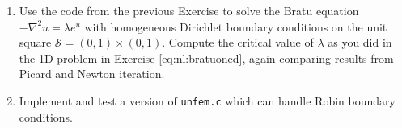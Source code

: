 \begin{enumerate}
\item \label{exer:un:bratu} Use the code from the previous Exercise to solve the Bratu equation $-\nabla^2 u = \lambda e^u$ with homogeneous Dirichlet boundary conditions on the unit square $\mathcal{S}=(0,1)\times(0,1)$.  Compute the critical value of $\lambda$ as you did in the 1D problem in Exercise \ref{eq:nl:bratuoned}, again comparing results from Picard and Newton iteration.
\item \label{exer:un:robin} Implement and test a version of \texttt{unfem.c} which can handle Robin boundary conditions.
\end{enumerate}


